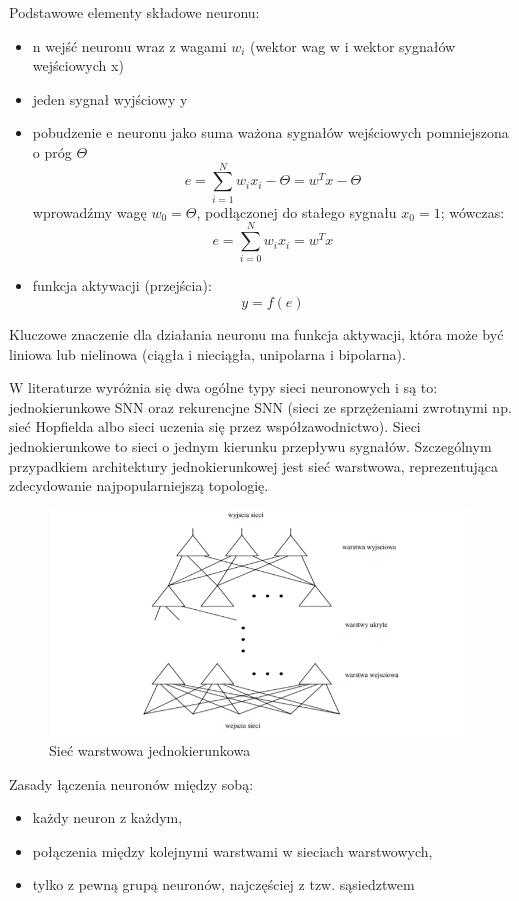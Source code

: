 Podstawowe elementy składowe neuronu: 
\begin{itemize}
    \item n wejść neuronu wraz z wagami $w_{i}$ (wektor wag w i wektor sygnałów wejściowych x)
    \item jeden sygnał wyjściowy y
    \item pobudzenie e neuronu jako suma ważona sygnałów wejściowych
pomniejszona o próg $\Theta$
\[
e = \sum_{i=1}^{N} w_{i} x_{i} - \Theta = w^{T} x - \Theta
\]
wprowadźmy wagę $w_{0}= \Theta$, podłączonej do stałego sygnału $x_{0} = 1$;
wówczas: 
\[
e = \sum_{i=0}^{N} w_{i} x_{i}  = w^{T} x
\]
\item funkcja aktywacji (przejścia):
\[
y = f(e)
\]
\end{itemize}
Kluczowe znaczenie dla działania neuronu ma funkcja aktywacji, która może być liniowa lub nielinowa (ciągła i nieciągła, unipolarna i bipolarna).

W literaturze wyróżnia się dwa ogólne typy sieci neuronowych i są to: jednokierunkowe SNN oraz rekurencjne SNN (sieci ze sprzężeniami zwrotnymi np. sieć Hopfielda albo sieci uczenia się przez współzawodnictwo).
Sieci jednokierunkowe to sieci o jednym kierunku przepływu sygnałów. Szczególnym przypadkiem architektury jednokierunkowej jest sieć warstwowa, reprezentująca zdecydowanie najpopularniejszą topologię.
\begin{figure}[H] 
        \centering\includegraphics[width=12cm,height=6cm]{figures/ArchitekturaSNN.png}
        \caption{Sieć warstwowa jednokierunkowa}\label{SVM-neuron}
\end{figure}

Zasady łączenia neuronów między sobą:
\begin{itemize}
    \item każdy neuron z każdym,
    \item połączenia między kolejnymi warstwami w sieciach warstwowych,
    \item tylko z pewną grupą neuronów, najczęściej z tzw. sąsiedztwem
\end{itemize}

